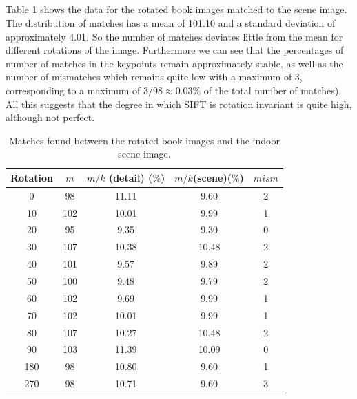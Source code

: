 \documentclass{article}
\begin{document}
\subsection{}
Table \ref{table4} shows the data for the rotated book images matched to the scene image. The distribution of matches has a mean of 101.10 and a standard deviation of approximately 4.01. So the number of matches deviates little from the mean for different rotations of the image. Furthermore we can see that the percentages of number of matches in the keypoints remain approximately stable, as well as the number of mismatches which remains quite low with a maximum of 3, corresponding to a maximum of $3/98 \approx 0.03 \% $ of the total number of matches). All this suggests that the degree in which SIFT is rotation invariant is quite high, although not perfect.

\begin{table}[H]
\centering
 \caption{Matches found between the rotated book images and the indoor scene image.}
 \label{table4}
 \begin{tabular}{|c|c|c|c|c|}
 \hline
  Rotation & $m$ & $m/k$ (detail) ($\%$) & $m/k$(scene)($\%$) & $mism$\\
  \hline
  0 & 98 & 11.11 & 9.60 & 2 \\
  10 & 102 & 10.01 & 9.99 & 1 \\
  20 & 95 & 9.35 & 9.30 & 0 \\
  30 & 107 & 10.38 & 10.48 & 2 \\
  40 & 101 & 9.57 & 9.89 & 2 \\
  50 & 100 & 9.48 & 9.79 & 2 \\
  60 & 102 & 9.69 & 9.99 & 1 \\
  70 & 102 & 10.01 & 9.99 & 1 \\
  80 & 107 & 10.27 & 10.48 & 2 \\
  90 & 103 & 11.39 & 10.09 & 0 \\
  180 & 98 & 10.80 & 9.60 & 1 \\
  270 & 98 & 10.71 & 9.60 & 3 \\
  \hline
 \end{tabular}
\end{table}

\subsection{}


\end{document}
